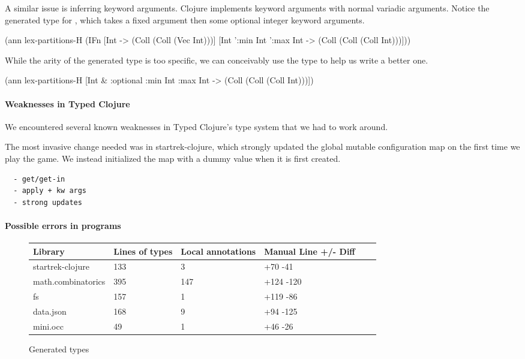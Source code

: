 A similar issue is inferring keyword arguments. Clojure implements
keyword arguments with normal variadic arguments. Notice
the generated type for ,
which takes a fixed argument then some optional integer keyword
arguments. 

\begin{cljlisting}
(ann lex-partitions-H
	(IFn [Int -> (Coll (Coll (Vec Int)))]
		   [Int ':min Int ':max Int 
        -> (Coll (Coll (Coll Int)))]))
\end{cljlisting}

While the arity of the generated type is too specific,
we can conceivably use the type to help us write a better one.

\begin{cljlisting}
(ann lex-partitions-H
  [Int & :optional {:min Int :max Int}
   -> (Coll (Coll (Coll Int)))])
\end{cljlisting}

\paragraph{Weaknesses in Typed Clojure}

We encountered several known weaknesses in Typed Clojure's type system
that we had to work around.

The most invasive change needed was in startrek-clojure, which
strongly updated the global mutable configuration map on the first
time we play the game. We instead initialized the map with a dummy
value when it is first created.

\begin{verbatim}
  - get/get-in
  - apply + kw args
  - strong updates
\end{verbatim}

\paragraph{Possible errors in programs}

\begin{figure*}
\begin{tabular}{| l | l | l | l | l | l |}
  Library            & Lines of types  & Local annotations & Manual Line +/- Diff \\
  \hline
  startrek-clojure   & 133             & 3                 & +70 -41 \\
  math.combinatorics & 395             & 147               & +124 -120\\
  fs                 & 157             & 1                 & +119 -86\\
  data.json          & 168             & 9                 & +94 -125 \\
  mini.occ           & 49              & 1                 & +46 -26\\
\end{tabular}
\caption{Generated types}
\end{figure*}

